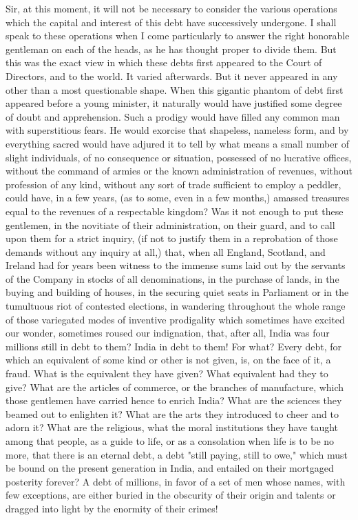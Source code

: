 Sir, at this moment, it will not be necessary to consider the various operations which the capital and interest of this debt have successively undergone. I shall speak to these operations when I come particularly to answer the right honorable gentleman on each of the heads, as he has thought proper to divide them. But this was the exact view in which these debts first appeared to the Court of Directors, and to the world. It varied afterwards. But it never appeared in any other than a most questionable shape. When this gigantic phantom of debt first appeared before a young minister, it naturally would have justified some degree of doubt and apprehension. Such a prodigy would have filled any common man with superstitious fears. He would exorcise that shapeless, nameless form, and by everything sacred would have adjured it to tell by what means a small number of slight individuals, of no consequence or situation, possessed of no lucrative offices, without the command of armies or the known administration of revenues, without profession of any kind, without any sort of trade sufficient to employ a peddler, could have, in a few years, (as to some, even in a few months,) amassed treasures equal to the revenues of a respectable kingdom? Was it not enough to put these gentlemen, in the novitiate of their administration, on their guard, and to call upon them for a strict inquiry, (if not to justify them in a reprobation of those demands without any inquiry at all,) that, when all England, Scotland, and Ireland had for years been witness to the immense sums laid out by the servants of the Company in stocks of all denominations, in the purchase of lands, in the buying and building of houses, in the securing quiet seats in Parliament or in the tumultuous riot of contested elections, in wandering throughout the whole range of those variegated modes of inventive prodigality which sometimes have excited our wonder, sometimes roused our indignation, that, after all, India was four millions still in debt to them? India in debt to them! For what? Every debt, for which an equivalent of some kind or other is not given, is, on the face of it, a fraud. What is the equivalent they have given? What equivalent had they to give? What are the articles of commerce, or the branches of manufacture, which those gentlemen have carried hence to enrich India? What are the sciences they beamed out to enlighten it? What are the arts they introduced to cheer and to adorn it? What are the religious, what the moral institutions they have taught among that people, as a guide to life, or as a consolation when life is to be no more, that there is an eternal debt, a debt "still paying, still to owe," which must be bound on the present generation in India, and entailed on their mortgaged posterity forever? A debt of millions, in favor of a set of men whose names, with few exceptions, are either buried in the obscurity of their origin and talents or dragged into light by the enormity of their crimes!

